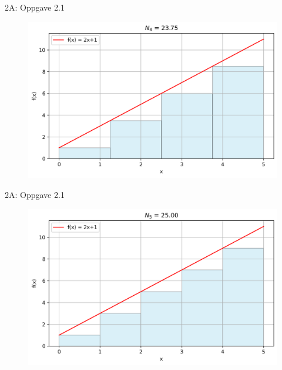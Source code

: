 \greenheader
\begin{frame}{2A: Oppgave 2.1}
\begin{figure}
    \centering
    \includegraphics[width=0.8\linewidth]{R2-K2A-141.png}
\end{figure}
\end{frame}

\greenheader
\begin{frame}{2A: Oppgave 2.1}
\begin{figure}
    \centering
    \includegraphics[width=0.8\linewidth]{R2-K2A-151.png}
\end{figure}
\end{frame}









